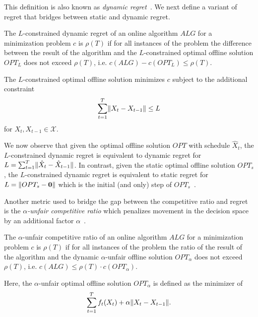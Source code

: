 This definition is also known as \emph{dynamic regret}~\cite{Chen2018}. We next define a variant of regret that bridges between static and dynamic regret.

\begin{definition}
\cite{Chen2018} The $L$-constrained dynamic regret of an online algorithm $ALG$ for a minimization problem $c$ is $\rho(T)$ if for all instances of the problem the difference between the result of the algorithm and the $L$-constrained optimal offline solution $OPT_L$ does not exceed $\rho(T)$, i.e. $c(ALG) - c(OPT_L) \leq \rho(T)$.

The $L$-constrained optimal offline solution minimizes $c$ subject to the additional constraint \begin{align*}
    \sum_{t=1}^T \lVert X_t - X_{t-1}\rVert \leq L
\end{align*} for $X_t, X_{t-1} \in \mathcal{X}$.
\end{definition}

We now observe that given the optimal offline solution $OPT$ with schedule $\hat{X}_t$, the $L$-constrained dynamic regret is equivalent to dynamic regret for $L = \sum_{t=1}^T \lVert\hat{X}_t - \hat{X}_{t-1}\rVert$. In contrast, given the static optimal offline solution $OPT_s$, the $L$-constrained dynamic regret is equivalent to static regret for $L = \lVert OPT_s - \mathbf{0}\rVert$ which is the initial (and only) step of $OPT_s$~\cite{Chen2018}.

Another metric used to bridge the gap between the competitive ratio and regret is the \emph{$\alpha$-unfair competitive ratio} which penalizes movement in the decision space by an additional factor $\alpha$~\cite{Andrew2015}.

\begin{definition}
\cite{Andrew2015} The $\alpha$-unfair competitive ratio of an online algorithm $ALG$ for a minimization problem $c$ is $\rho(T)$ if for all instances of the problem the ratio of the result of the algorithm and the dynamic $\alpha$-unfair offline solution $OPT_{\alpha}$ does not exceed $\rho(T)$, i.e. $c(ALG) \leq \rho(T) \cdot c(OPT_{\alpha})$.

Here, the $\alpha$-unfair optimal offline solution $OPT_{\alpha}$ is defined as the minimizer of \begin{align*}
    \sum_{t=1}^T f_t(X_t) + \alpha \lVert X_t - X_{t-1}\rVert.
\end{align*}
\end{definition}

